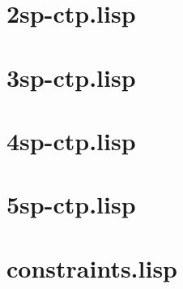 \section{2sp-ctp.lisp}

\section{3sp-ctp.lisp}

\section{4sp-ctp.lisp}

\section{5sp-ctp.lisp}

\section{constraints.lisp}
